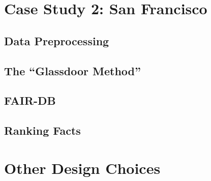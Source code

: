 \newpage
\section{Case Study 2: San Francisco}
\subsection{Data Preprocessing}
\subsection{The ``Glassdoor Method''}
\subsection{FAIR-DB}
\subsection{Ranking Facts}


\section{Other Design Choices}

